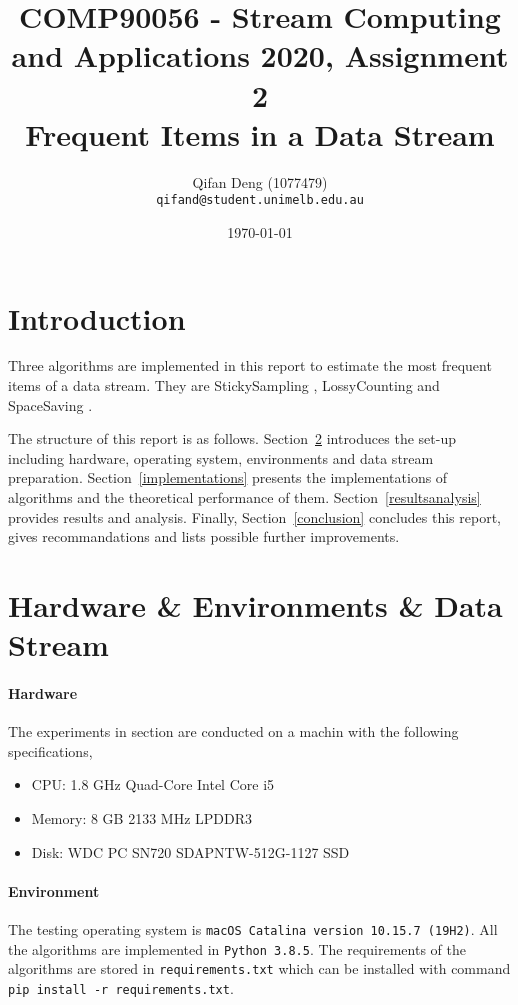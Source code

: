 \documentclass[10pt]{article}
\title{COMP90056 - Stream Computing and Applications 2020, Assignment 2 
\\Frequent Items in a Data Stream}
\author{
  Qifan Deng (1077479)\\
  \texttt{qifand@student.unimelb.edu.au} }
\date{\printdayoff\normalsize\today}
\begin{document}
\sloppy
\maketitle

\section{Introduction}
Three algorithms are implemented in this report to estimate the most frequent items of a data stream.
They are StickySampling \cite{stickylossy}, LossyCounting \cite{stickylossy} and SpaceSaving \cite{spacesaving}. 

The structure of this report is as follows. 
Section~\ref{preparation} introduces the set-up including hardware, operating system, environments 
and data stream preparation.
Section~\ref{implementations} presents the implementations of algorithms 
and the theoretical performance of them.
Section~\ref{resultsanalysis} provides results and analysis. 
Finally, Section~\ref{conclusion} concludes this report,
gives recommandations and lists possible further improvements. 

\section{Hardware \& Environments \& Data Stream}\label{preparation}

\paragraph{Hardware}
The experiments in section are conducted on a machin with the following specifications,
\begin{itemize}
     \setlength\itemsep{1pt}
       \item CPU: 1.8 GHz Quad-Core Intel Core i5
       \item Memory: 8 GB 2133 MHz LPDDR3
       \item Disk: WDC PC SN720 SDAPNTW-512G-1127 SSD
\end{itemize}
\paragraph{Environment}
The testing operating system is \texttt{macOS Catalina version 10.15.7 (19H2)}.
All the algorithms are implemented in \texttt{Python 3.8.5}.
The requirements of the algorithms are stored in \texttt{requirements.txt} which can be installed with command \texttt{pip install -r requirements.txt}.
\end{document}

